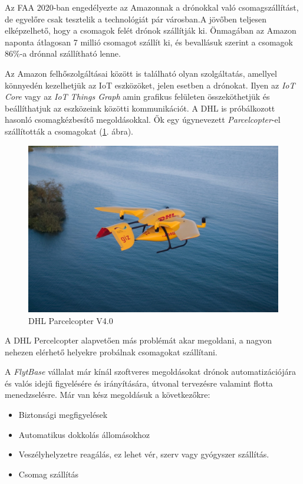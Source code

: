 Az FAA 2020-ban engedélyezte az Amazonnak a drónokkal való csomagszállítást, de egyelőre csak tesztelik a technológiát pár városban.A jövőben teljesen elképzelhető, hogy a csomagok felét drónok szállítják ki. Önmagában az Amazon naponta átlagosan 7 millió csomagot szállít ki, és bevallásuk szerint a csomagok 86\%-a drónnal szállítható lenne.

Az Amazon felhőszolgáltásai között is található olyan szolgáltatás, amellyel könnyedén kezelhetjük az IoT eszközöket, jelen esetben a drónokat.
Ilyen az \textit{IoT Core} vagy az \textit{IoT Things Graph} amin grafikus felületen összeköthetjük és beállíthatjuk az eszközeink közötti kommunikációt.
A DHL is próbálkozott hasonló csomagkézbesítő megoldásokkal. Ők egy úgynevezett  \textit{Parcelcopter}-el szállították a csomagokat (\ref{fig:parcelcopter}. ábra).

\begin{figure}[h]
    \centering
    \includegraphics[scale=1.0]{images/parcelcopter.jpeg}
    \caption{DHL Parcelcopter V4.0 \cite{dhl_2018}}
    \label{fig:parcelcopter}
\end{figure}

A DHL Percelcopter alapvetően más problémát akar megoldani, a nagyon nehezen elérhető helyekre probálnak csomagokat szállítani.

A \textit{FlytBase} \cite{flyt} vállalat már kínál szoftveres megoldásokat drónok automatizációjára és valós idejű figyelésére és irányítására, útvonal tervezésre valamint flotta menedzselésre.
Már van kész megoldásuk a következőkre:
\begin{itemize}
    \item Biztonsági megfigyelések
    \item Automatikus dokkolás állomásokhoz
    \item Veszélyhelyzetre reagálás, ez lehet vér, szerv vagy gyógyszer szállítás.
    \item Csomag szállítás
\end{itemize}


